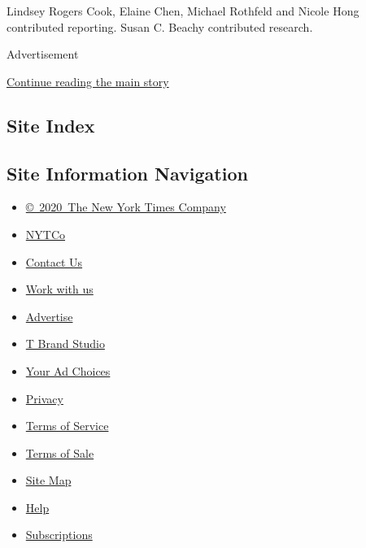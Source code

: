 Lindsey Rogers Cook, Elaine Chen, Michael Rothfeld and Nicole Hong
contributed reporting. Susan C. Beachy contributed research.

Advertisement

\protect\hyperlink{after-bottom}{Continue reading the main story}

\hypertarget{site-index}{%
\subsection{Site Index}\label{site-index}}

\hypertarget{site-information-navigation}{%
\subsection{Site Information
Navigation}\label{site-information-navigation}}

\begin{itemize}
\tightlist
\item
  \href{https://help.nytimes.com/hc/en-us/articles/115014792127-Copyright-notice}{©~2020~The
  New York Times Company}
\end{itemize}

\begin{itemize}
\tightlist
\item
  \href{https://www.nytco.com/}{NYTCo}
\item
  \href{https://help.nytimes.com/hc/en-us/articles/115015385887-Contact-Us}{Contact
  Us}
\item
  \href{https://www.nytco.com/careers/}{Work with us}
\item
  \href{https://nytmediakit.com/}{Advertise}
\item
  \href{http://www.tbrandstudio.com/}{T Brand Studio}
\item
  \href{https://www.nytimes.com/privacy/cookie-policy\#how-do-i-manage-trackers}{Your
  Ad Choices}
\item
  \href{https://www.nytimes.com/privacy}{Privacy}
\item
  \href{https://help.nytimes.com/hc/en-us/articles/115014893428-Terms-of-service}{Terms
  of Service}
\item
  \href{https://help.nytimes.com/hc/en-us/articles/115014893968-Terms-of-sale}{Terms
  of Sale}
\item
  \href{https://spiderbites.nytimes.com}{Site Map}
\item
  \href{https://help.nytimes.com/hc/en-us}{Help}
\item
  \href{https://www.nytimes.com/subscription?campaignId=37WXW}{Subscriptions}
\end{itemize}
